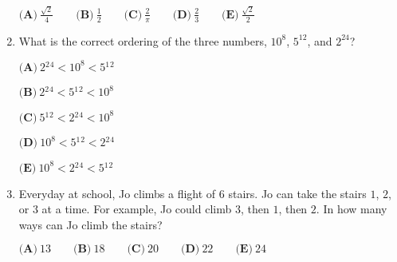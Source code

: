 \documentclass{article}
\begin{document}
\begin{enumerate}[label=\arabic*., itemsep=0.5em]
\( \textbf{(A)}\ \frac{\sqrt 2}{4}\qquad\textbf{(B)}\ \frac{1}{2}\qquad\textbf{(C)}\ \frac{2}{\pi}\qquad\textbf{(D)}\ \frac{2}{3}\qquad\textbf{(E)}\ \frac{\sqrt 2}{2} \)\par \vspace{0.5em}\item What is the correct ordering of the three numbers, \(10^8\), \(5^{12}\), and \(2^{24}\)?

\( \textbf{(A)}\ 2{}^2{}^4<10^8<5{}^1{}^2 \)

\( \textbf{(B)}\ 2{}^2{}^4<5{}^1{}^2<10^8 \)

\( \textbf{(C)}\ 5{}^1{}^2<2{}^2{}^4<10^8 \)

\( \textbf{(D)}\ 10^8<5{}^1{}^2<2{}^2{}^4\)

\( \textbf{(E)}\ 10^8<2{}^2{}^4<5{}^1{}^2 \)\par \vspace{0.5em}\item Everyday at school, Jo climbs a flight of \(6\) stairs. Jo can take the stairs \(1\), \(2\), or \(3\) at a time. For example, Jo could climb \(3\), then \(1\), then \(2\). In how many ways can Jo climb the stairs?

\( \textbf{(A)}\ 13 \qquad\textbf{(B)}\ 18\qquad\textbf{(C)}\ 20\qquad\textbf{(D)}\ 22\qquad\textbf{(E)}\ 24 \)\par \vspace{0.5em}
\end{enumerate}
\end{document}
